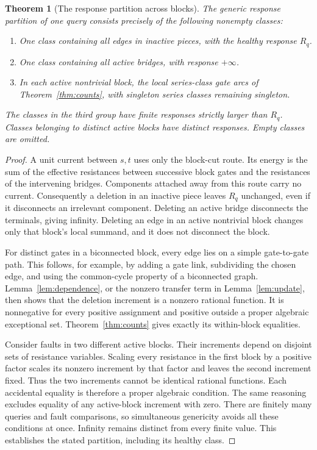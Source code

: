 \documentclass[11pt,letterpaper]{article}
\newtheorem{theorem}{Theorem}
\begin{document}
\begin{theorem}[The response partition across blocks]\label{thm:blockpartition}
The generic response partition of one query consists precisely of the following nonempty classes:
\begin{enumerate}
\item One class containing all edges in inactive pieces, with the healthy response $R_q$.
\item One class containing all active bridges, with response $+\infty$.
\item In each active nontrivial block, the local series-class gate arcs of Theorem~\ref{thm:counts}, with singleton series classes remaining singleton.
\end{enumerate}
The classes in the third group have finite responses strictly larger than $R_q$. Classes belonging to distinct active blocks have distinct responses. Empty classes are omitted.
\end{theorem}
\begin{proof}
A unit current between $s,t$ uses only the block-cut route. Its energy is the sum of the effective resistances between successive block gates and the resistances of the intervening bridges. Components attached away from this route carry no current. Consequently a deletion in an inactive piece leaves $R_q$ unchanged, even if it disconnects an irrelevant component. Deleting an active bridge disconnects the terminals, giving infinity. Deleting an edge in an active nontrivial block changes only that block's local summand, and it does not disconnect the block.

For distinct gates in a biconnected block, every edge lies on a simple gate-to-gate path. This follows, for example, by adding a gate link, subdividing the chosen edge, and using the common-cycle property of a biconnected graph. Lemma~\ref{lem:dependence}, or the nonzero transfer term in Lemma~\ref{lem:update}, then shows that the deletion increment is a nonzero rational function. It is nonnegative for every positive assignment and positive outside a proper algebraic exceptional set. Theorem~\ref{thm:counts} gives exactly its within-block equalities.

Consider faults in two different active blocks. Their increments depend on disjoint sets of resistance variables. Scaling every resistance in the first block by a positive factor scales its nonzero increment by that factor and leaves the second increment fixed. Thus the two increments cannot be identical rational functions. Each accidental equality is therefore a proper algebraic condition. The same reasoning excludes equality of any active-block increment with zero. There are finitely many queries and fault comparisons, so simultaneous genericity avoids all these conditions at once. Infinity remains distinct from every finite value. This establishes the stated partition, including its healthy class.
\end{proof}
\end{document}
